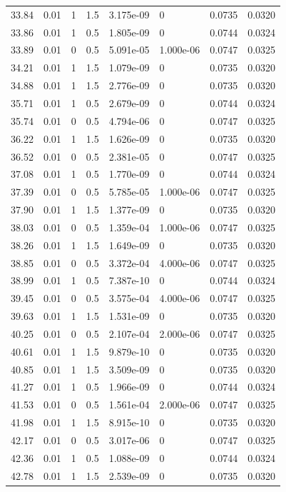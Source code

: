\documentclass[preview]{standalone}
\begin{document}
{{{\begin{tabular}{L{1.2cm}C{1.2cm} C{0.3cm}C{0.5cm} C{1.4cm}C{1.4cm} C{1.4cm}C{1.4cm}}
  33.84  &  0.01  & 1     & 1.5 &  3.175e-09  & 0  & 0.0735 &  0.0320   \\ 
  33.86  &  0.01  & 1     & 0.5 &  1.805e-09  & 0  & 0.0744 &  0.0324   \\ 
  33.89  &  0.01  & 0     & 0.5 &  5.091e-05  & 1.000e-06  & 0.0747 &  0.0325   \\ 
  34.21  &  0.01  & 1     & 1.5 &  1.079e-09  & 0  & 0.0735 &  0.0320   \\ 
  34.88  &  0.01  & 1     & 1.5 &  2.776e-09  & 0  & 0.0735 &  0.0320   \\ 
  35.71  &  0.01  & 1     & 0.5 &  2.679e-09  & 0  & 0.0744 &  0.0324   \\ 
  35.74  &  0.01  & 0     & 0.5 &  4.794e-06  & 0  & 0.0747 &  0.0325   \\ 
  36.22  &  0.01  & 1     & 1.5 &  1.626e-09  & 0  & 0.0735 &  0.0320   \\ 
  36.52  &  0.01  & 0     & 0.5 &  2.381e-05  & 0  & 0.0747 &  0.0325   \\ 
  37.08  &  0.01  & 1     & 0.5 &  1.770e-09  & 0  & 0.0744 &  0.0324   \\ 
  37.39  &  0.01  & 0     & 0.5 &  5.785e-05  & 1.000e-06  & 0.0747 &  0.0325   \\ 
  37.90  &  0.01  & 1     & 1.5 &  1.377e-09  & 0  & 0.0735 &  0.0320   \\ 
  38.03  &  0.01  & 0     & 0.5 &  1.359e-04  & 1.000e-06  & 0.0747 &  0.0325   \\ 
  38.26  &  0.01  & 1     & 1.5 &  1.649e-09  & 0  & 0.0735 &  0.0320   \\ 
  38.85  &  0.01  & 0     & 0.5 &  3.372e-04  & 4.000e-06  & 0.0747 &  0.0325   \\ 
  38.99  &  0.01  & 1     & 0.5 &  7.387e-10  & 0  & 0.0744 &  0.0324   \\ 
  39.45  &  0.01  & 0     & 0.5 &  3.575e-04  & 4.000e-06  & 0.0747 &  0.0325   \\ 
  39.63  &  0.01  & 1     & 1.5 &  1.531e-09  & 0  & 0.0735 &  0.0320   \\ 
  40.25  &  0.01  & 0     & 0.5 &  2.107e-04  & 2.000e-06  & 0.0747 &  0.0325   \\ 
  40.61  &  0.01  & 1     & 1.5 &  9.879e-10  & 0  & 0.0735 &  0.0320   \\ 
  40.85  &  0.01  & 1     & 1.5 &  3.509e-09  & 0  & 0.0735 &  0.0320   \\ 
  41.27  &  0.01  & 1     & 0.5 &  1.966e-09  & 0  & 0.0744 &  0.0324   \\ 
  41.53  &  0.01  & 0     & 0.5 &  1.561e-04  & 2.000e-06  & 0.0747 &  0.0325   \\ 
  41.98  &  0.01  & 1     & 1.5 &  8.915e-10  & 0  & 0.0735 &  0.0320   \\ 
  42.17  &  0.01  & 0     & 0.5 &  3.017e-06  & 0  & 0.0747 &  0.0325   \\ 
  42.36  &  0.01  & 1     & 0.5 &  1.088e-09  & 0  & 0.0744 &  0.0324   \\ 
  42.78  &  0.01  & 1     & 1.5 &  2.539e-09  & 0  & 0.0735 &  0.0320   \\ 
\hline 
\end{tabular} 

}}}
\end{document}
